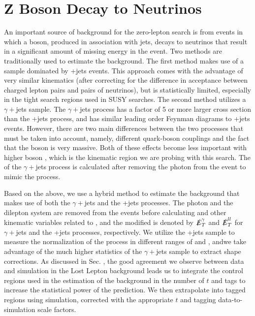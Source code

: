 \section{Z Boson Decay to Neutrinos}
\label{subsec:Znunu}

An important source of background for the zero-lepton search is from events in which a \Z{} boson, produced in association with jets, decays to neutrinos that result in a significant amount of missing energy in the event. Two methods are traditionally used to estimate the \Znunu{} background. The first method makes use of a sample dominated by \Zll+jets events. This approach comes with the advantage of very similar kinematics (after correcting for the difference in acceptance between charged lepton pairs and pairs of neutrinos), but is statistically limited, especially in the tight search regions used in SUSY searches. The second method utilizes a $\gamma+$jets sample. The $\gamma+$jets process has a factor of 5 or more larger cross section than the \Zll+jets process, and has similar leading order Feynman diagrams to \Z+jets events. However, there are two main differences between the two processes that must be taken into account, namely, different quark-boson couplings and the fact that the \Z{} boson is very massive. Both of these effects become less important with higher boson \pt, which is the kinematic region we are probing with this search. The \met{} of the $\gamma+$jets process is calculated after removing the photon from the event to mimic the \Znunu{} process.

Based on the above, we use a hybrid method to estimate the \Znunu{} background that makes use of both the $\gamma+$jets and the \Zll+jets processes. The photon and the dilepton system are removed from the events before calculating \met{} and other kinematic variables related to \met, and the modified \met{} is denoted by $\slashed{E}_{T}^\gamma$ and $\slashed{E}_{T}^{ll}$ for $\gamma+$jets and the \Zll+jets processes, respectively. We utilize the \Zll+jets sample to measure the normalization of the \Znunu{} process in different ranges of \nb{} and \nsv, andwe take advantage of the much higher statistics of the $\gamma+$jets sample to extract shape corrections. As discussed in Sec. , the good agreement we observe between data and simulation in the Lost Lepton background leads us to integrate the control regions used in the estimation of the \Znunu{} background in the number of $t$ and \W{} tags to increase the statistical power of the prediction. We then extrapolate into tagged regions using simulation, corrected with the appropriate $t$ and \W{} tagging data-to-simulation scale factors.

